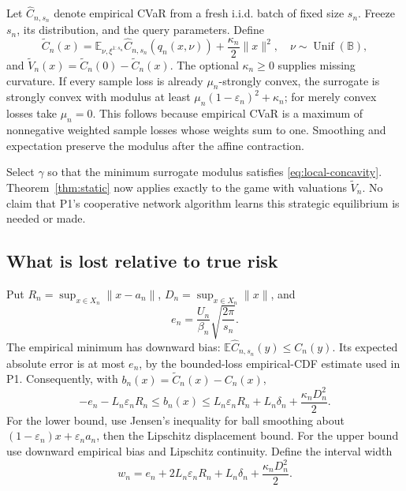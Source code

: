 \documentclass[11pt,a4paper]{article}
\newcommand{\E}{\mathbb E}
\begin{document}
Let $\widehat C_{n,s_n}$ denote empirical CVaR from a fresh i.i.d. batch of
fixed size $s_n$. Freeze $s_n$, its distribution, and the query parameters.
Define
\begin{equation}
 \widetilde C_n(x)=
 \E_{\nu,\xi^{1:s_n}}\widehat C_{n,s_n}(q_n(x,\nu))
 +\frac{\kappa_n}{2}\|x\|^2,
 \quad \nu\sim\operatorname{Unif}(\mathbb B),
 \label{eq:surrogate}
\end{equation}
and $\widetilde V_n(x)=\widetilde C_n(0)-\widetilde C_n(x)$.
The optional $\kappa_n\geq0$ supplies missing curvature. If every sample
loss is already $\mu_n$-strongly convex, the surrogate is strongly convex
with modulus at least $\mu_n(1-\varepsilon_n)^2+\kappa_n$; for merely
convex losses take $\mu_n=0$. This follows because empirical CVaR is a
maximum of nonnegative weighted sample losses whose weights sum to one.
Smoothing and expectation preserve the modulus after the affine contraction.

Select $\gamma$ so that the minimum surrogate modulus satisfies
\eqref{eq:local-concavity}. Theorem~\ref{thm:static} now applies exactly to
the game with valuations $\widetilde V_n$. No claim that P1's cooperative
network algorithm learns this strategic equilibrium is needed or made.

\subsection{What is lost relative to true risk}

Put $R_n=\sup_{x\in X_n}\|x-a_n\|$, $D_n=\sup_{x\in X_n}\|x\|$, and
\begin{equation}
 e_n=\frac{U_n}{\beta_n}\sqrt{\frac{2\pi}{s_n}}.
\end{equation}
The empirical minimum has downward bias:
$\E\widehat C_{n,s_n}(y)\leq C_n(y)$. Its expected absolute error is at
most $e_n$, by the bounded-loss empirical-CDF estimate used in P1.
Consequently, with $b_n(x)=\widetilde C_n(x)-C_n(x)$,
\begin{equation}
 -e_n-L_n\varepsilon_nR_n
 \leq b_n(x)\leq
 L_n\varepsilon_nR_n+L_n\delta_n+\frac{\kappa_nD_n^2}{2}.
 \label{eq:one-sided}
\end{equation}
For the lower bound, use Jensen's inequality for ball smoothing about
$(1-\varepsilon_n)x+\varepsilon_na_n$, then the Lipschitz displacement
bound. For the upper bound use downward empirical bias and Lipschitz
continuity. Define the interval width
\begin{equation}
 w_n=e_n+2L_n\varepsilon_nR_n+L_n\delta_n
            +\frac{\kappa_nD_n^2}{2}.
 \label{eq:width}
\end{equation}
\end{document}

